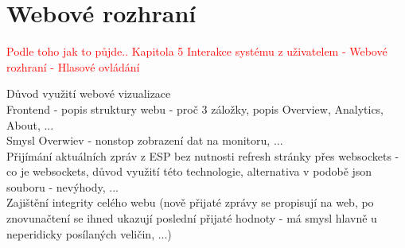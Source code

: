 \chapter{Webové rozhraní} \label{chap:methods}

\textcolor{red}{Podle toho jak to půjde.. 
Kapitola 5
Interakce systému z uživatelem
- Webové rozhraní
- Hlasové ovládání}



Důvod využití webové vizualizace \\ 
Frontend - popis struktury webu - proč 3 záložky, popis Overview, Analytics, About, ... \\
Smysl Overwiev - nonstop zobrazení dat na monitoru, ... \\
Přijímání aktuálních zpráv z ESP bez nutnosti refresh stránky přes websockets - co je websockets, důvod využití této technologie, alternativa v podobě json souboru - nevýhody, ... \\


Zajištění integrity celého webu (nově přijaté zprávy se propisují na web, po znovunačtení se ihned ukazují poslední přijaté hodnoty - má smysl hlavně u neperidicky posílaných veličin, ...) \\



